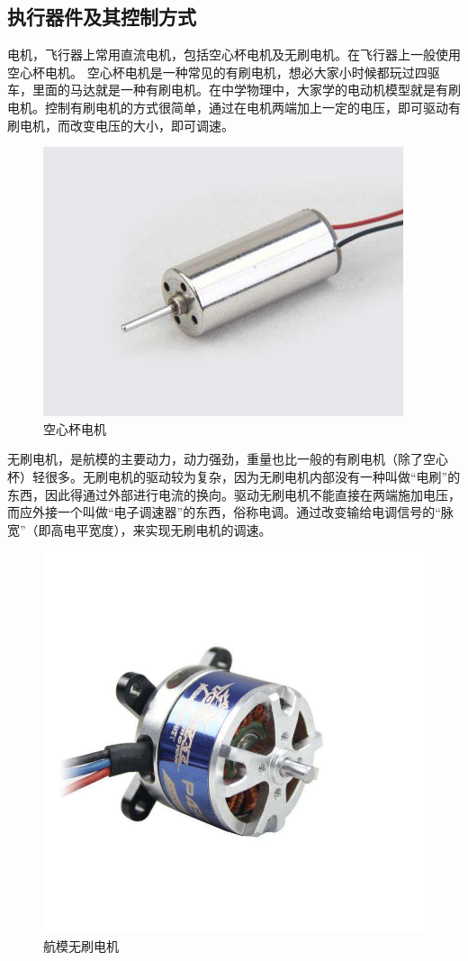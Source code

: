 \documentclass{article}
\begin{document}
\subsection{执行器件及其控制方式}
电机，飞行器上常用直流电机，包括空心杯电机及无刷电机。在飞行器上一般使用空心杯电机。
空心杯电机是一种常见的有刷电机，想必大家小时候都玩过四驱车，里面的马达就是一种有刷电机。在中学物理中，大家学的电动机模型就是有刷电机。控制有刷电机的方式很简单，通过在电机两端加上一定的电压，即可驱动有刷电机，而改变电压的大小，即可调速。
\begin{figure}[ht]
\centering
\includegraphics[scale=0.4]{空心杯.jpg}
\caption{空心杯电机}
\label{fig:label}
\end{figure}

无刷电机，是航模的主要动力，动力强劲，重量也比一般的有刷电机（除了空心杯）轻很多。无刷电机的驱动较为复杂，因为无刷电机内部没有一种叫做“电刷”的东西，因此得通过外部进行电流的换向。驱动无刷电机不能直接在两端施加电压，而应外接一个叫做“电子调速器”的东西，俗称电调。通过改变输给电调信号的“脉宽”（即高电平宽度），来实现无刷电机的调速。
\begin{figure}[htbp]
	\centering
	\includegraphics[scale=0.2]{无刷.jpg}
	\caption{航模无刷电机}
	\label{fig:label}
\end{figure}
\end{document}

